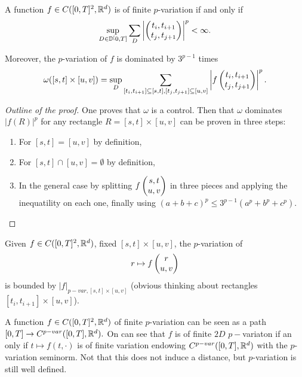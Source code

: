 \begin{lemma}
    A function $f \in C([0,T]^2, \mathbb{R}^d)$ is of finite $p$-variation if and only if   
    \begin{equation}
        \sup_{D \in \mathbb{D}^[0,T]} \sum_D \left| \begin{pmatrix} t_i, t_{i+1} \\ t_j, t_{j+1} \end{pmatrix} \right|^p < \infty.
    \end{equation}

    Moreover, the $p$-variation of $f$ is dominated by $3^{p-1}$ times
    \begin{equation}
        \omega([s,t] \times [u,v]) = \sup_D \sum_{[t_i,t_{i+1}] \subseteq [s,t], [t_j,t_{j+1}] \subseteq [u,v]} \left| f \begin{pmatrix} t_i, t_{i+1} \\ t_j, t_{j+1} \end{pmatrix} \right|^p.
    \end{equation}
\end{lemma}
\begin{proof}[Outline of the proof]
    One proves that $\omega$ is a control.
    Then that $\omega$ dominates $|f(R)|^p$ for any rectangle $R = [s,t] \times [u,v]$ can be proven in three steps:
    \begin{enumerate}
        \item For $[s,t] = [u,v]$ by definition,
        \item For $[s,t] \cap [u,v] = \emptyset$ by definition,
        \item In the general case by splitting $f \begin{pmatrix} s,t \\ u,v \end{pmatrix}$ in three pieces and applying the inequatility on each one, finally using $(a + b + c)^p \le 3^{p-1} (a^p + b^p + c^p).$
    \end{enumerate}
\end{proof}

\begin{example}
    Given $f \in C([0,T]^2, \mathbb{R}^d)$, fixed $[s,t] \times [u,v]$, the $p$-variation of 
    \begin{equation}
        r \mapsto f \begin{pmatrix} r \\ u,v \end{pmatrix}
    \end{equation}
    is bounded by $|f|_{p-var,[s,t] \times [u,v]}$ (obvious thinking about rectangles $[t_i,t_{i+1}] \times [u,v]$).
\end{example}

\begin{observation}
    A function $f \in C([0,T]^2,\mathbb{R}^d)$ of finite $p$-variation can be seen as a path $[0,T] \rightarrow C^{p-var}([0,T],\mathbb{R}^d).$ On can see that $f$ is of finite $2D$ $p-$variaton if an only if $t \mapsto f(t, \cdot)$ is of finite variation endowing $C^{p-var}([0,T],\mathbb{R}^d)$ with the $p$-variation seminorm. Not that this does not induce a distance, but $p$-variation is still well defined.
\end{observation}

